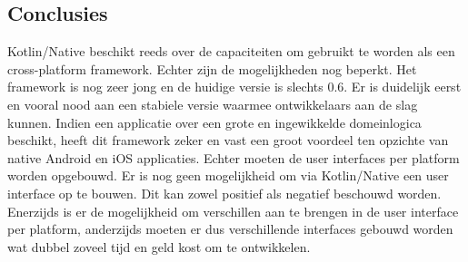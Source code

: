 \documentclass[a0,portrait]{a0poster}
\begin{document}
\begin{multicols}{2}

\color{HoGentAccent1} 
\section*{Conclusies}
\color{black}
Kotlin/Native beschikt reeds over de capaciteiten om gebruikt te worden als een cross-platform framework. Echter zijn de mogelijkheden nog beperkt. Het framework is nog zeer jong en de huidige versie is slechts 0.6. Er is duidelijk eerst en vooral nood aan een stabiele versie waarmee ontwikkelaars aan de slag kunnen. Indien een applicatie over een grote en ingewikkelde domeinlogica beschikt, heeft dit framework zeker en vast een groot voordeel ten opzichte van native Android en iOS applicaties. Echter moeten de user interfaces per platform worden opgebouwd. Er is nog geen mogelijkheid om via Kotlin/Native een user interface op te bouwen. Dit kan zowel positief als negatief beschouwd worden. Enerzijds is er de mogelijkheid om verschillen aan te brengen in de user interface per platform, anderzijds moeten er dus verschillende interfaces gebouwd worden wat dubbel zoveel tijd en geld kost om te ontwikkelen.
\color{HoGentAccent1} 

\end{multicols}
\end{document}
